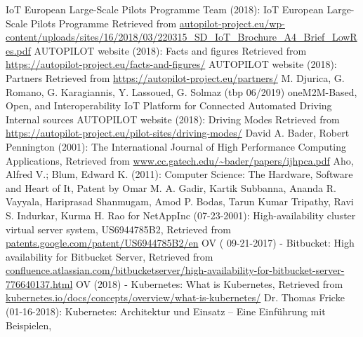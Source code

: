 

\begin{thebibliography}{..........}
   	  	IoT European Large-Scale Pilots Programme Team (2018):
                           	IoT European Large-Scale Pilots Programme
                              	Retrieved from \url{autopilot-project.eu/wp-content/uploads/sites/16/2018/03/220315_SD_IoT_Brochure_A4_Brief_LowRes.pdf}
   	  	AUTOPILOT website (2018):
                           	Facts and figures
                              	Retrieved from \url{https://autopilot-project.eu/facts-and-figures/}
   	  	AUTOPILOT website (2018):
                           	Partners
                              	Retrieved from \url{https://autopilot-project.eu/partners/}
   	  	M. Djurica, G. Romano, G. Karagiannis, Y. Lassoued, G. Solmaz (tbp 06/2019)
                           	oneM2M-Based, Open, and Interoperability IoT Platform for Connected Automated Driving
                           	Internal sources
   	  	AUTOPILOT website (2018):
                           	Driving Modes
                              	Retrieved from \url{https://autopilot-project.eu/pilot-sites/driving-modes/}
   	 	David A. Bader, Robert Pennington (2001): 
                               The International Journal of High Performance Computing Applications,
                               Retrieved from \url{www.cc.gatech.edu/~bader/papers/ijhpca.pdf}
   		Aho, Alfred V.; Blum, Edward K. (2011):
                              	Computer Science: The Hardware, Software and Heart of It,
   		Patent by Omar M. A. Gadir, Kartik Subbanna, Ananda R. Vayyala, Hariprasad Shanmugam, Amod P. Bodas, Tarun Kumar Tripathy, Ravi S. Indurkar, Kurma H. Rao  for NetAppInc (07-23-2001):
   				High-availability cluster virtual server system,
   				US6944785B2,
                              	Retrieved from \url{patents.google.com/patent/US6944785B2/en}
   		OV ( 09-21-2017) - Bitbucket:
                              	High availability for Bitbucket Server,
                              	Retrieved from \url{confluence.atlassian.com/bitbucketserver/high-availability-for-bitbucket-server-776640137.html}
   \bibitem[]{}	OV (2018) - Kubernetes:
   				What is Kubernetes,
   				Retrieved from \url{kubernetes.io/docs/concepts/overview/what-is-kubernetes/}
   \bibitem[]{}	Dr. Thomas Fricke (01-16-2018):
                              	Kubernetes: Architektur und Einsatz – Eine Einführung mit Beispielen,

\end{thebibliography}

